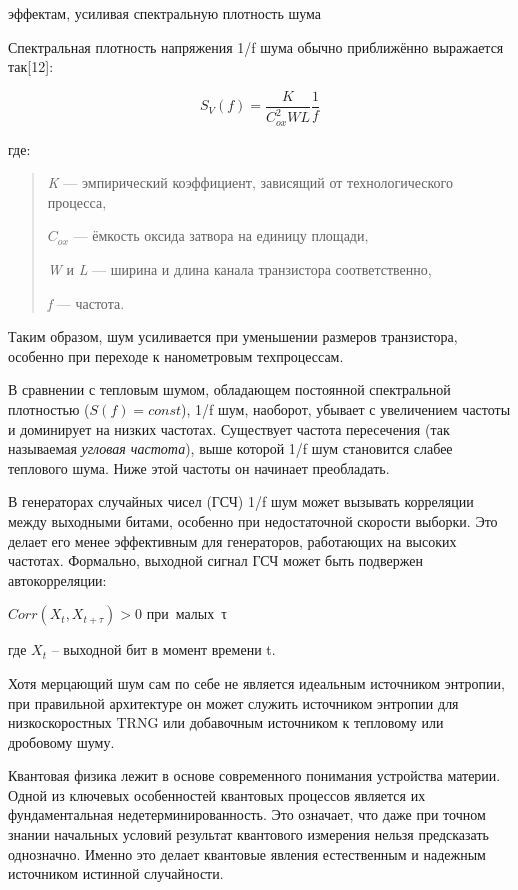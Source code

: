эффектам, усиливая спектральную плотность шума

Спектральная плотность напряжения 1/f шума обычно приближённо выражается
так{[}12{]}:

\[S_{V}(f) = \frac{K}{C_{ox}^{2}WL}\frac{1}{f}\]

где:

\begin{quote}
\emph{K} --- эмпирический коэффициент, зависящий от технологического
процесса,

\(C_{ox}\) --- ёмкость оксида затвора на единицу площади,

\emph{W} и \emph{L} --- ширина и длина канала транзистора
соответственно,

\emph{f} --- частота.
\end{quote}

Таким образом, шум усиливается при уменьшении размеров транзистора,
особенно при переходе к нанометровым техпроцессам.

В сравнении с тепловым шумом, обладающем постоянной спектральной
плотностью (\(S(f) = const\)), 1/f шум, наоборот, убывает с увеличением
частоты и доминирует на низких частотах. Существует частота пересечения
(так называемая \emph{угловая частота}), выше которой 1/f шум становится
слабее теплового шума. Ниже этой частоты он начинает преобладать.

В генераторах случайных чисел (ГСЧ) 1/f шум может вызывать корреляции
между выходными битами, особенно при недостаточной скорости выборки. Это
делает его менее эффективным для генераторов, работающих на высоких
частотах. Формально, выходной сигнал ГСЧ может быть подвержен
автокорреляции:

\(Corr(X_{t},X_{t + \tau}) > 0\) при~малых~τ

где \(X_{t}\) -- выходной бит в момент времени t.

Хотя мерцающий шум сам по себе не является идеальным источником
энтропии, при правильной архитектуре он может служить источником
энтропии для низкоскоростных TRNG или добавочным источником к тепловому
или дробовому шуму.

\begin{quote}
\end{quote}

Квантовая физика лежит в основе современного понимания устройства
материи. Одной из ключевых особенностей квантовых процессов является их
фундаментальная недетерминированность. Это означает, что даже при точном
знании начальных условий результат квантового измерения нельзя
предсказать однозначно. Именно это делает квантовые явления естественным
и надежным источником истинной случайности.

